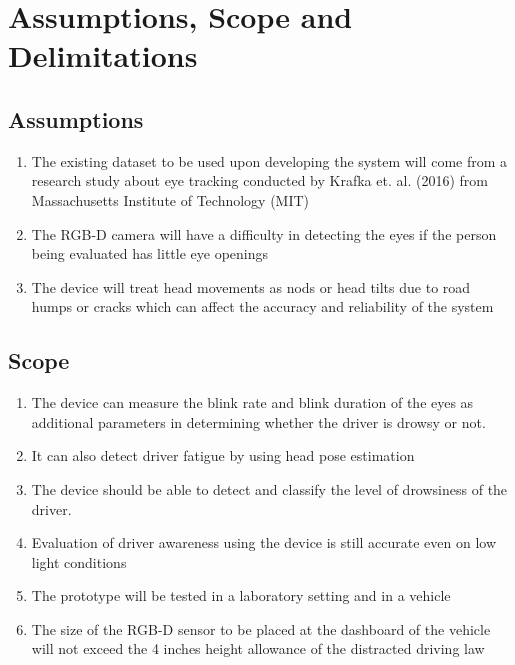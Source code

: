 \section{Assumptions, Scope and Delimitations}


\subsection{Assumptions}
\begin{enumerate}
	
	\item The existing dataset to be used upon developing the system will come from a research study about eye tracking conducted by Krafka et. al. (2016) from Massachusetts Institute of Technology (MIT) 
	
	\item The RGB-D camera will have a difficulty in detecting the eyes if the person being evaluated has little eye openings 
	
	\item The device will treat head movements as nods or head tilts due to road humps or cracks which can affect the accuracy and reliability of the system
	

	
\end{enumerate}

\subsection{Scope}
\begin{enumerate}
	
	\item The device can measure the blink rate and blink duration of the eyes as additional parameters in determining whether the driver is drowsy or not.
	
	\item It can also detect driver fatigue by using head pose estimation
	
	\item The device should be able to detect and classify the level of drowsiness of the driver.
	
	
	\item Evaluation of driver awareness using the device is still accurate even on low light conditions
	
	\item The prototype will be tested in a laboratory setting and in a vehicle
	
	\item The size of the RGB-D sensor to be placed at the dashboard of the vehicle will not exceed the 4 inches height allowance of the distracted driving law
	
	
\end{enumerate}

